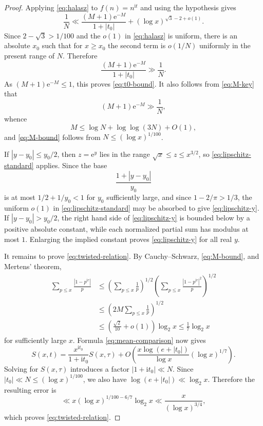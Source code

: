 \documentclass[12pt,reqno]{amsart}
\theoremstyle{remark}
\numberwithin{equation}{section}
\newcommand{\e}{\mathrm e}
\newcommand{\ii}{\mathrm i}
\newcommand{\logtwo}{\log_2}
\begin{document}
\begin{proof}
Applying \eqref{eq:halasz} to $f(n)=n^{\ii t}$ and using the hypothesis gives
\[
\frac1N
\ll
\frac{(M+1)\e^{-M}}{1+|t_0|}
+(\log x)^{\sqrt3-2+o(1)}.
\]
Since $2-\sqrt3>1/100$ and the $o(1)$ in \eqref{eq:halasz} is uniform, there is an absolute $x_0$ such that for $x\ge x_0$ the second term is $o(1/N)$ uniformly in the present range of $N$.  Therefore
\begin{equation}\label{eq:M-key}
\frac{(M+1)\e^{-M}}{1+|t_0|}\gg\frac1N.
\end{equation}
As $(M+1)\e^{-M}\le1$, this proves \eqref{eq:t0-bound}.  It also follows from \eqref{eq:M-key} that
\[
(M+1)\e^{-M}\gg\frac1N,
\]
whence
\[
M\le \log N+\log\log(3N)+O(1),
\]
and \eqref{eq:M-bound} follows from $N\le(\log x)^{1/100}$.

If $|y-y_0|\le y_0/2$, then $z=\e^y$ lies in the range $\sqrt{x}\le z\le x^{3/2}$, so \eqref{eq:lipschitz-standard} applies.  Since the base
\[
\frac{1+|y-y_0|}{y_0}
\]
is at most $1/2+1/y_0<1$ for $y_0$ sufficiently large, and since $1-2/\pi>1/3$, the uniform $o(1)$ in \eqref{eq:lipschitz-standard} may be absorbed to give \eqref{eq:lipschitz-y}.  If $|y-y_0|>y_0/2$, the right hand side of \eqref{eq:lipschitz-y} is bounded below by a positive absolute constant, while each normalized partial sum has modulus at most $1$.  Enlarging the implied constant proves \eqref{eq:lipschitz-y} for all real $y$.

It remains to prove \eqref{eq:twisted-relation}.  By Cauchy--Schwarz, \eqref{eq:M-bound}, and Mertens' theorem,
\begin{align*}
\sum_{p\le x}\frac{|1-p^{\ii\tau}|}{p}
&\le
\left(\sum_{p\le x}\frac1p\right)^{1/2}
\left(\sum_{p\le x}\frac{|1-p^{\ii\tau}|^2}{p}\right)^{1/2}\\
&\le
\left(2M\sum_{p\le x}\frac1p\right)^{1/2}\\
&\le \left(\frac{\sqrt2}{10}+o(1)\right)\logtwo x
\le \frac17\logtwo x
\end{align*}
for sufficiently large $x$.  Formula \eqref{eq:mean-comparison} now gives
\[
S(x,t)=\frac{x^{\ii t_0}}{1+\ii t_0}S(x,\tau)
+O\!\left(
\frac{x\log(e+|t_0|)}{\log x}(\log x)^{1/7}
\right).
\]
Solving for $S(x,\tau)$ introduces a factor $|1+\ii t_0|\ll N$.  Since
$|t_0|\ll N\le(\log x)^{1/100}$, we also have
$\log(e+|t_0|)\ll\logtwo x$.  Therefore the resulting error is
\[
\ll x(\log x)^{1/100-6/7}\logtwo x
\ll \frac{x}{(\log x)^{3/4}},
\]
which proves \eqref{eq:twisted-relation}.
\end{proof}
\end{document}
